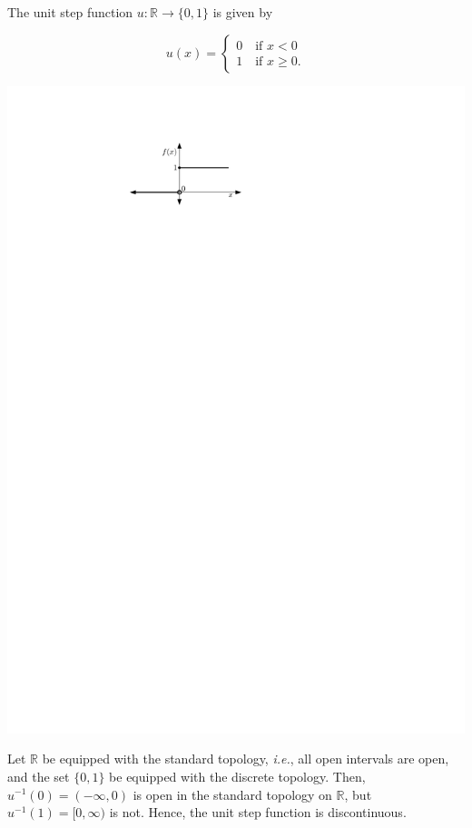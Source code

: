 \documentclass[a4paper,english,12pt]{article}
\begin{document}
\begin{exmp}
The unit step function $u:\mathbb{R}\rightarrow \{0,1\}$ is given by 

  \begin{minipage}{.5\textwidth}
	\begin{equation*}
	u(x)= \begin{cases}
			0 \quad \text{if $x<0$}\\
			1 \quad \text{if $x\geqslant 0$}.
			\end{cases}
	\end{equation*}
  \end{minipage}%
  \begin{minipage}{.25\textwidth}
    \centering
    \includegraphics[scale=0.7]{Figures/step.pdf}
  \end{minipage}
  
\noindent Let $\mathbb{R}$ be equipped with the standard topology, \emph{i.e.}, all open intervals are open, and the set $\{0,1\}$ be equipped with the discrete topology. Then, $u^{-1}(0)=(-\infty,0)$ is open in the standard topology on $\mathbb{R}$, but $u^{-1}(1)=[0,\infty)$ is not. Hence, the unit step function is discontinuous.
\end{exmp}
\end{document}

